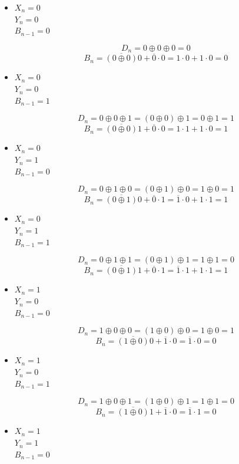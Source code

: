 \documentclass{article}
\begin{document}
\begin{itemize}
	\item
	$X_n = 0$ \\
	$Y_n = 0$ \\
	$B_{n-1} = 0$

	\[D_n = 0 \oplus 0 \oplus 0 = 0\]
	\[B_n = \overline{(0 \oplus 0)}0 + \overline{0} \cdot 0 =
		1 \cdot 0 + 1 \cdot 0 = 0\]

	\item
	$X_n = 0$ \\
	$Y_n = 0$ \\
	$B_{n-1} = 1$

	\[D_n = 0 \oplus 0 \oplus 1 = (0 \oplus 0) \oplus 1 = 0 \oplus 1 = 1\]
	\[B_n = \overline{(0 \oplus 0)}1 + \overline{0} \cdot 0 =
		1 \cdot 1 + 1 \cdot 0 = 1\]

	\item
	$X_n = 0$ \\
	$Y_n = 1$ \\
	$B_{n-1} = 0$

	\[D_n = 0 \oplus 1 \oplus 0 = (0 \oplus 1) \oplus 0 = 1 \oplus 0 = 1\]
	\[B_n = \overline{(0 \oplus 1)}0 + \overline{0} \cdot 1 =
		\overline{1} \cdot 0 + 1 \cdot 1 = 1\]

	\item
	$X_n = 0$ \\
	$Y_n = 1$ \\
	$B_{n-1} = 1$

	\[D_n = 0 \oplus 1 \oplus 1 = (0 \oplus 1) \oplus 1 = 1 \oplus 1 = 0\]
	\[B_n = \overline{(0 \oplus 1)}1 + \overline{0} \cdot 1 =
		\overline{1} \cdot 1 + 1 \cdot 1 = 1\]

	\item
	$X_n = 1$ \\
	$Y_n = 0$ \\
	$B_{n-1} = 0$

	\[D_n = 1 \oplus 0 \oplus 0 = (1 \oplus 0) \oplus 0 = 1 \oplus 0 = 1\]
	\[B_n = \overline{(1 \oplus 0)}0 + \overline{1} \cdot 0 =
		\overline{1} \cdot 0 = 0\]

	\item
	$X_n = 1$ \\
	$Y_n = 0$ \\
	$B_{n-1} = 1$

	\[D_n = 1 \oplus 0 \oplus 1 = (1 \oplus 0) \oplus 1 = 1 \oplus 1 = 0\]
	\[B_n = \overline{(1 \oplus 0)}1 + \overline{1} \cdot 0 =
		\overline{1} \cdot 1 = 0\]

	\item
	$X_n = 1$ \\
	$Y_n = 1$ \\
	$B_{n-1} = 0$


\end{itemize}
\end{document}
